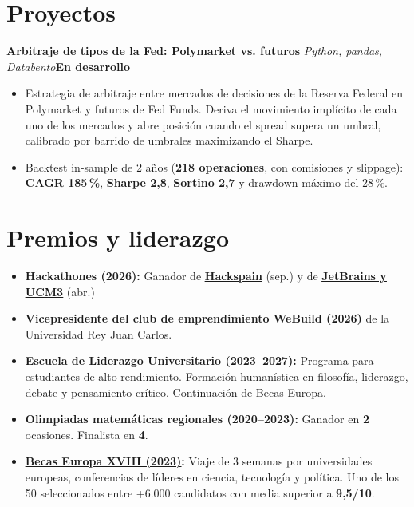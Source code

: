 \documentclass[10pt,letterpaper]{article}
\newenvironment{cvblock}{%
  \begin{list}{}{%
    \setlength{\leftmargin}{10.8pt}%
    \setlength{\rightmargin}{5.4pt}%
    \setlength{\topsep}{0pt}%
    \setlength{\partopsep}{0pt}%
    \setlength{\parsep}{0pt}%
    \setlength{\itemsep}{0pt}%
  }\item[]%
}{\end{list}}
\newcommand{\cvproject}[3]{%
  {\fontsize{11}{13}\selectfont\textbf{#1}\,\textbar\,\textit{#2}\hfill\hspace{1em}\textbf{#3}\par}%
}
\newenvironment{cvbullets}{%
  \begin{itemize}[leftmargin=24pt,label=\textbullet,
    labelsep=5pt,itemsep=1pt,topsep=1pt,parsep=0pt,partopsep=0pt]%
}{\end{itemize}}
\begin{document}
\section{Proyectos}
\begin{cvblock}
  \cvproject{Arbitraje de tipos de la Fed: Polymarket vs. futuros}
    {Python, pandas, Databento}{En desarrollo}
  \begin{cvbullets}
    \item Estrategia de arbitraje entre mercados de decisiones de la Reserva Federal en Polymarket y futuros de Fed Funds. Deriva el movimiento implícito de cada uno de los mercados y abre posición cuando el spread supera un umbral, calibrado por barrido de umbrales maximizando el Sharpe.
    \item Backtest in-sample de 2 años (\textbf{218 operaciones}, con comisiones y slippage): \textbf{CAGR 185\,\%}, \textbf{Sharpe 2,8}, \textbf{Sortino 2,7} y drawdown máximo del 28\,\%.
  \end{cvbullets}
\end{cvblock}

\section{Premios y liderazgo}
\begin{cvblock}
  \begin{cvbullets}
    \item \textbf{Hackathones (2026):} Ganador de \href{https://lnkd.in/p/eifTBpXn}{\underline{\textbf{Hackspain}}} (sep.) y de \href{https://lnkd.in/p/emWiMK5R}{\underline{\textbf{JetBrains y UCM3}}} (abr.)
    \item \textbf{Vicepresidente del club de emprendimiento WeBuild (2026)} de la Universidad Rey Juan Carlos.
    \item \textbf{Escuela de Liderazgo Universitario (2023--2027):} Programa para estudiantes de alto rendimiento. Formación humanística en filosofía, liderazgo, debate y pensamiento crítico. Continuación de Becas Europa.
    \item \textbf{Olimpiadas matemáticas regionales (2020--2023):} Ganador en \textbf{2} ocasiones. Finalista en \textbf{4}.
    \item \href{https://www.diariodeburgos.es/noticia/ze412122f-0175-d486-dbf315234ef7e036/202306/un-alumno-de-10-que-busca-el-135}{\underline{\textbf{Becas Europa XVIII (2023)}}}\textbf{:} Viaje de 3 semanas por universidades europeas, conferencias de líderes en ciencia, tecnología y política. Uno de los 50 seleccionados entre +6.000 candidatos con media superior a \textbf{9,5/10}. 
  \end{cvbullets}
\end{cvblock}
\end{document}
